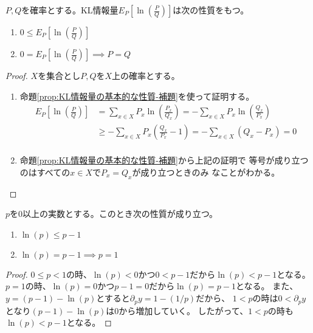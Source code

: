		\begin{proposition}[KL情報量の基本的な性質]\label{prop:KL情報量の基本的な性質} %
			$P,Q$を確率とする。KL情報量$E_P[\ln(\frac{P}{Q})]$は次の性質をもつ。
			\begin{enumerate}\setlength{\itemsep}{-1mm} %
				\item $0 \le E_P[\ln(\frac{P}{Q})]$
				\item $0 = E_P[\ln(\frac{P}{Q})] \implies P=Q$
			\end{enumerate} %
		\end{proposition} %
		\begin{proof} %
			$X$を集合とし$P,Q$を$X$上の確率とする。
			\begin{enumerate}\setlength{\itemsep}{-1mm} %
				\item 命題\ref{prop:KL情報量の基本的な性質-補題}を使って証明する。
				\begin{equation*}\begin{split} %
					E_P[\ln(\frac{P}{Q})] &= \sum_{x\in X}P_x\ln(\frac{P_x}{Q_x})
					= - \sum_{x\in X}P_x\ln(\frac{Q_x}{P_x}) \\
					&\ge - \sum_{x\in X}P_x(\frac{Q_x}{P_x} - 1)
					= - \sum_{x\in X}(Q_x - P_x) = 0 \\
				\end{split}\end{equation*} %
				\item 命題\ref{prop:KL情報量の基本的な性質-補題}から上記の証明で
				等号が成り立つのはすべての$x\in X$で$P_x=Q_x$が成り立つときのみ
				なことがわかる。
			\end{enumerate} %
		\end{proof} %
		\begin{proposition}[KL情報量の基本的な性質-補題]\label{prop:KL情報量の基本的な性質-補題} %
			$p$を$0$以上の実数とする。このとき次の性質が成り立つ。
			\begin{enumerate}\setlength{\itemsep}{-1mm} %
				\item $\ln(p) \le p-1$
				\item $\ln(p) = p-1 \implies p=1$
			\end{enumerate} %
		\end{proposition} %
		\begin{proof} %
			$0\le p<1$の時、$\ln(p)<0$かつ$0<p-1$だから$\ln(p)<p-1$となる。
			$p=1$の時、$\ln(p)=0$かつ$p-1=0$だから$\ln(p)=p-1$となる。
			また、$y=(p-1)-\ln(p)$とすると$\partial_py=1-(1/p)$だから、
			$1<p$の時は$0<\partial_py$となり$(p-1)-\ln(p)$は$0$から増加していく。
			したがって、$1<p$の時も$\ln(p)<p-1$となる。
		\end{proof} %

